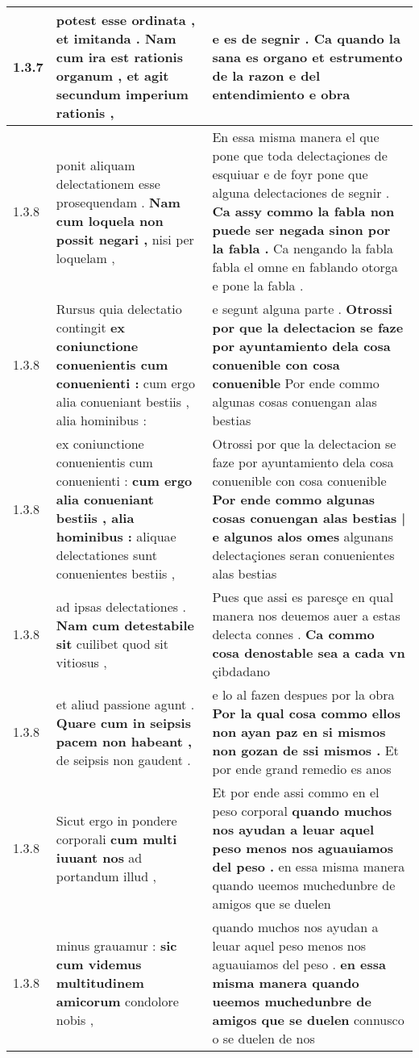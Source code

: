 \begin{tabular}{|p{1cm}|p{6.5cm}|p{6.5cm}|}
1.3.7 & potest esse ordinata , et imitanda . \textbf{ Nam cum ira est rationis organum , } et agit secundum imperium rationis , & e es de segnir . \textbf{ Ca quando la sana es organo } et estrumento de la razon e del entendimiento e obra \\\hline
1.3.8 & ponit aliquam delectationem esse prosequendam . \textbf{ Nam cum loquela non possit negari , } nisi per loquelam , & En essa misma manera el que pone que toda delectaçiones de esquiuar e de foyr pone que alguna delectaciones de segnir . \textbf{ Ca assy commo la fabla non puede ser negada sinon por la fabla . } Ca nengando la fabla fabla el omne en fablando otorga e pone la fabla . \\\hline
1.3.8 & Rursus quia delectatio contingit \textbf{ ex coniunctione conuenientis cum conuenienti : } cum ergo alia conueniant bestiis , alia hominibus : & e segunt alguna parte . \textbf{ Otrossi por que la delectacion se faze por ayuntamiento dela cosa conuenible con cosa conuenible } Por ende commo algunas cosas conuengan alas bestias \\\hline
1.3.8 & ex coniunctione conuenientis cum conuenienti : \textbf{ cum ergo alia conueniant bestiis , alia hominibus : } aliquae delectationes sunt conuenientes bestiis , & Otrossi por que la delectacion se faze por ayuntamiento dela cosa conuenible con cosa conuenible \textbf{ Por ende commo algunas cosas conuengan alas bestias | e algunos alos omes } algunans delectaçiones seran conuenientes alas bestias \\\hline
1.3.8 & ad ipsas delectationes . \textbf{ Nam cum detestabile sit } cuilibet quod sit vitiosus , & Pues que assi es paresçe en qual manera nos deuemos auer a estas delecta connes . \textbf{ Ca commo cosa denostable sea a cada vn } çibdadano \\\hline
1.3.8 & et aliud passione agunt . \textbf{ Quare cum in seipsis pacem non habeant , } de seipsis non gaudent . & e lo al fazen despues por la obra \textbf{ Por la qual cosa commo ellos non ayan paz en si mismos non gozan de ssi mismos . } Et por ende grand remedio es anos \\\hline
1.3.8 & Sicut ergo in pondere corporali \textbf{ cum multi iuuant nos } ad portandum illud , & Et por ende assi commo en el peso corporal \textbf{ quando muchos nos ayudan a leuar aquel peso menos nos aguauiamos del peso . } en essa misma manera quando ueemos muchedunbre de amigos que se duelen \\\hline
1.3.8 & minus grauamur : \textbf{ sic cum videmus multitudinem amicorum } condolore nobis , & quando muchos nos ayudan a leuar aquel peso menos nos aguauiamos del peso . \textbf{ en essa misma manera quando ueemos muchedunbre de amigos que se duelen } connusco o se duelen de nos \\\hline

\end{tabular}
